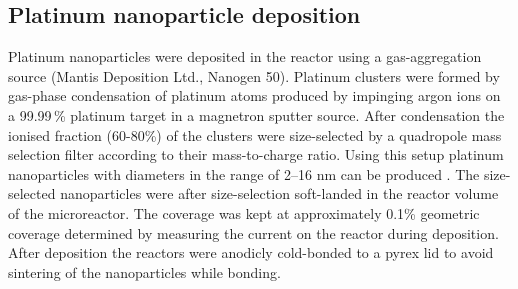 \documentclass[8.5pt,twoside,twocolumn]{article}
\begin{document}
\subsection{Platinum nanoparticle deposition}
Platinum nanoparticles were deposited in the reactor using a gas-aggregation source (Mantis Deposition Ltd., Nanogen 50). Platinum clusters were formed by gas-phase condensation of platinum atoms produced by impinging argon ions on a 99.99\,\% platinum target in a magnetron sputter source. After condensation the ionised fraction (60-80\%) of the clusters were size-selected by a quadropole mass selection filter according to their mass-to-charge ratio. Using this setup platinum nanoparticles with diameters in the range of 2–16 nm can be produced \cite{Nielsen2010,Nielsen2009}. The size-selected nanoparticles were after size-selection soft-landed in the reactor volume of the microreactor. The coverage was kept at approximately 0.1\% geometric coverage determined by measuring the current on the reactor during deposition. After deposition the reactors were anodicly cold-bonded \cite{Vesborg2010} to a pyrex lid to avoid sintering of the nanoparticles while bonding.

\end{document}
